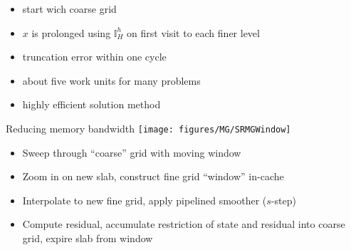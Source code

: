 \documentclass{beamer}
\newcommand{\vx}{\ensuremath{x}}
\begin{document}
\begin{frame}[fragile]
\begin{figure}
\label{fig:FMG}
\end{figure}
\begin{itemize}
  \item start wich coarse grid
  \item $\vx$ is prolonged using $\mathbb{I}_H^h$ on first visit to each finer level
  \item truncation error within one cycle
  \item about five work units for many problems
  \item highly efficient solution method
\end{itemize}
\end{frame}






\begin{frame}{Reducing memory bandwidth}
  \texttt{[image: figures/MG/SRMGWindow]}
  \begin{itemize}
  \item Sweep through ``coarse'' grid with moving window
  \item Zoom in on new slab, construct fine grid ``window'' in-cache
  \item Interpolate to new fine grid, apply pipelined smoother ($s$-step)
  \item Compute residual, accumulate restriction of state and residual into coarse grid, expire slab from window
  \end{itemize}
\end{frame}
\end{document}

